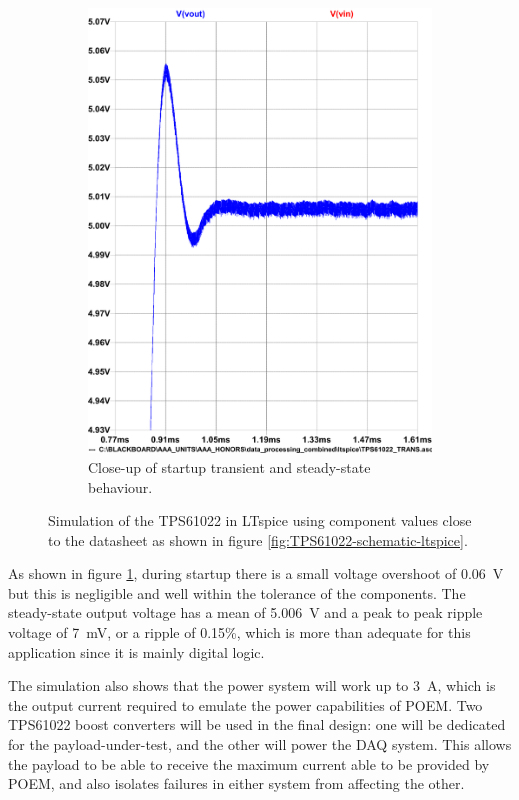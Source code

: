 \documentclass[]{report}
\begin{document}
\begin{figure}[H]
\begin{subfigure}{0.495\textwidth}
    \includegraphics[width=\linewidth]{images/TPS61022-simulation-plot-overshoot.pdf}
    \caption{Close-up of startup transient and steady-state behaviour.}
  \end{subfigure}
  \caption{Simulation of the TPS61022 in LTspice using component values close to the datasheet as shown in figure \ref{fig:TPS61022-schematic-ltspice}.}
  \label{fig:TPS61022-simulation-ltspice}
\end{figure}

As shown in figure \ref{fig:TPS61022-simulation-ltspice}, during startup there is a small voltage overshoot of \SI{0.06}{\volt} but this is negligible and well within the tolerance of the components. The steady-state output voltage has a mean of \SI{5.006}{\volt} and a peak to peak ripple voltage of \SI{7}{\milli\volt}, or a ripple of 0.15\%, which is more than adequate for this application since it is mainly digital logic.

The simulation also shows that the power system will work up to \SI{3}{\ampere}, which is the output current required to emulate the power capabilities of POEM. Two TPS61022 boost converters will be used in the final design: one will be dedicated for the payload-under-test, and the other will power the DAQ system. This allows the payload to be able to receive the maximum current able to be provided by POEM, and also isolates failures in either system from affecting the other.
\end{document}
